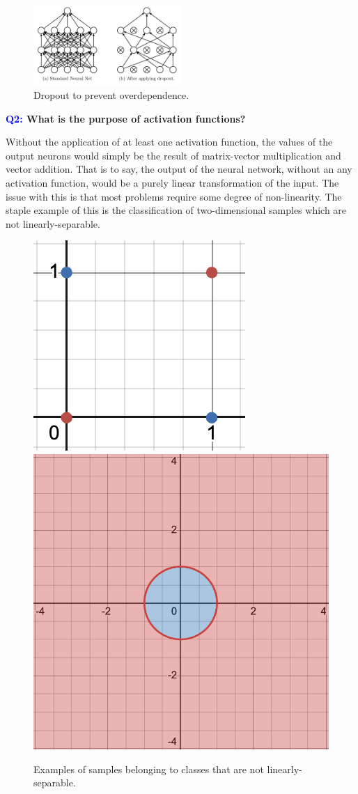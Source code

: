 \documentclass[11pt]{article}
\begin{document}
\begin{figure}[ht]
    \centering
    \includegraphics[width=0.5\textwidth]{./figures/neural_nets/REG_dropout.png}
    \caption{Dropout to prevent overdependence.}
    \label{fig:dropout}
\end{figure}

\begin{center}
    \textbf{\textcolor{blue}{Q2:} What is the purpose of activation functions?}
\end{center}
Without the application of at least one activation function, the values of the output neurons would simply be the result of matrix-vector multiplication and vector addition. That is to say, the output of the neural network, without an any activation function, would be a purely linear transformation of the input. The issue with this is that most problems require some degree of non-linearity. The staple example of this is the classification of two-dimensional samples which are not linearly-separable.

\begin{figure}[ht]
    \centering
    \includegraphics[width=0.40\columnwidth]{./figures/neural_nets/xor.png}
    \hspace{20pt}
    \includegraphics[width=0.40\columnwidth]{./figures/neural_nets/circle.png}
    \caption{\centering Examples of samples belonging to classes that are not linearly-separable.}
    \label{fig:non_linearly_separable}
\end{figure}
\end{document}

